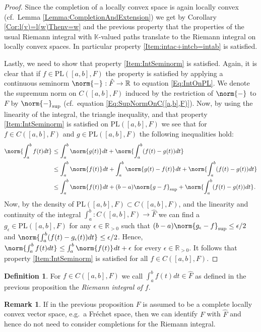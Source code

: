 \documentclass[12pt,a4paper]{article}
\theoremstyle{plain}
\theoremstyle{definition}
\newtheorem{definition}[theorem]{Definition}
\newtheorem{remark}[theorem]{Remark}
\newcommand{\R}{\mathbb{R}}
\newcommand{\K}{\mathbb{K}}
\newcommand{\nnorm}[2]{\norm{#1}_{#2}}
\begin{document}
\begin{proof}
Since the completion of a locally convex space is again locally convex (cf.~Lemma \ref{Lemma:CompletionAndExtension}) we get by Corollary \ref{Cor:l(v)=l(w)Thenv=w} and the previous property that the properties of the usual Riemann integral with $\K$-valued paths translate to the Riemann integral on locally convex spaces. In particular property \ref{Item:intac+intcb=intab} is satisfied.

Lastly, we need to show that property \ref{Item:IntSeminorm} is satisfied. Again, it is clear that if $f\in \mathrm{PL}([a,b],F)$ the property is satisfied by applying a continuous seminorm $\nnorm{-}{}:\hat F\to \R$ to equation \eqref{Eq:IntOnPL}. We denote the supremum norm on $C([a,b],F)$ induced by the restriction of $\nnorm{-}{}$ to $F$ by $\nnorm{-}{\mathrm{sup}}$ (cf.~equation \eqref{Eq:SupNormOnC([a,b],F)}). Now, by using the linearity of the integral, the triangle inequality, and that property \ref{Item:IntSeminorm} is satisfied on $\mathrm{PL}([a,b],F)$ we see that for $f\in C([a,b],F)$ and $g\in \mathrm{PL}([a,b],F)$ the following inequalities hold: 
\begin{align*}
    \nnorm{\int_a^bf(t)dt}{}&\leq \int_a^b\nnorm{g(t)}{}dt+\nnorm{\int_a^b(f(t)-g(t))dt}{} \\ 
    &\leq \int_a^b\nnorm{f(t)}{}dt+\int_a^b\nnorm{g(t)-f(t)}{}dt+\nnorm{\int_a^b(f(t)-g(t))dt}{} \\
    &\leq \int_a^b\nnorm{f(t)}{}dt+(b-a)\nnorm{g-f}{\mathrm{sup}}+\nnorm{\int_a^b(f(t)-g(t))dt}{}.
\end{align*}
Now, by the density of $\mathrm{PL}([a,b],F)\subset C([a,b],F)$, and the linearity and continuity of the integral $\int_a^b:C([a,b],F)\to \hat F$ we can find a $g_\epsilon \in \mathrm{PL}([a,b],F)$ for any $\epsilon \in \R_{>0}$ such that $(b-a)\nnorm{g_\epsilon-f}{\mathrm{sup}}\leq \epsilon/2$ and $\nnorm{\int_a^b(f(t)-g_\epsilon(t))dt}{}\leq \epsilon /2$. Hence, $\nnorm{\int_a^bf(t)dt}{}\leq \int_a^b\nnorm{f(t)}{}dt+\epsilon$ for every $\epsilon\in \R_{>0}$. It follows that property \ref{Item:IntSeminorm} is satisfied for all $f\in C([a,b],F)$.
\end{proof}

\begin{definition}
For $f\in C([a,b],F)$ we call $\int_a^bf(t)dt\in \hat F$ as defined in the previous proposition the \textit{Riemann integral of $f$}.
\end{definition}

\begin{remark}
If in the previous proposition $F$ is assumed to be a complete locally convex vector space, e.g.~a Fréchet space, then we can identify $F$ with $\hat F$ and hence do not need to consider completions for the Riemann integral.
\end{remark}
\end{document}
